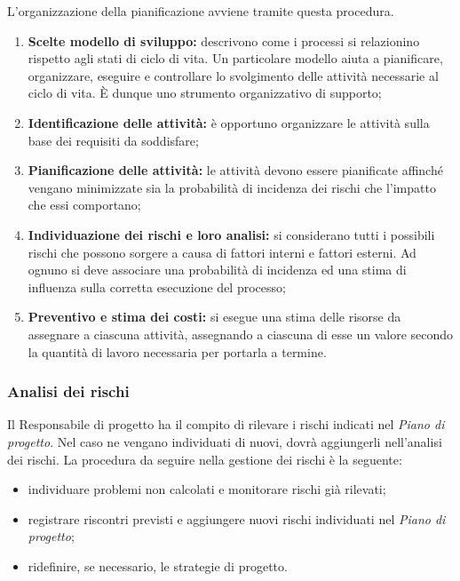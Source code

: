 \documentclass[11pt,a4paper]{article}
\begin{document}
{	L’organizzazione della pianificazione avviene tramite questa procedura.
	
	\begin{enumerate}
		\item \textbf{Scelte modello di sviluppo:} descrivono come i processi si relazionino rispetto agli stati di ciclo di vita. Un particolare modello aiuta a pianificare, organizzare, eseguire e controllare lo svolgimento delle attività necessarie al ciclo di vita. È dunque uno strumento organizzativo di supporto;
		\item \textbf{Identificazione delle attività:} è opportuno organizzare le attività sulla base dei requisiti da soddisfare;
		\item \textbf{Pianificazione delle attività:} le attività devono essere pianificate affinché vengano minimizzate sia la probabilità di incidenza dei rischi che l'impatto che essi comportano;
		\item \textbf{Individuazione dei rischi e loro analisi:} si considerano tutti i possibili rischi che possono sorgere a causa di fattori interni e fattori esterni. Ad ognuno si deve associare una probabilità di incidenza ed una stima di influenza sulla corretta esecuzione del processo;
		\item \textbf{Preventivo e stima dei costi:} si esegue una stima delle risorse da assegnare a ciascuna attività, assegnando a ciascuna di esse un valore secondo la quantità di lavoro necessaria per portarla a termine.
	\end{enumerate}
	
	\subsubsection{Analisi dei rischi}
	
	Il Responsabile di progetto ha il compito di rilevare i rischi indicati nel \textit{Piano di progetto}. Nel caso ne vengano individuati di nuovi, dovrà aggiungerli nell'analisi dei rischi. La procedura da seguire nella gestione dei rischi è la seguente:
	\begin{itemize}
		\item individuare problemi non calcolati e monitorare rischi già rilevati;
		\item registrare riscontri previsti e aggiungere nuovi rischi individuati nel \textit{Piano di progetto};
		\item ridefinire, se necessario, le strategie di progetto.
	\end{itemize}
	
}
\end{document}
